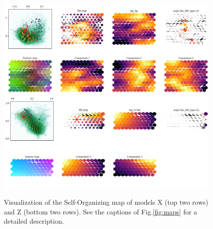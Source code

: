 \documentclass[utf8]{frontiersSCNS} %
\begin{document}
\begin{figure}[h!]
	\begin{center}
		\includegraphics[width=16cm]{XuBorovsky/maps}\\%
		\includegraphics[width=16cm]{ZhaZuFi/maps}
	\end{center}
	\caption{Visualization of the Self-Organizing map of models X (top two rows) and Z (bottom two rows). See the captions of Fig.\ref{fig:maps} for a detailed description.}\label{fig:modelsXZ}
\end{figure}
\end{document}

